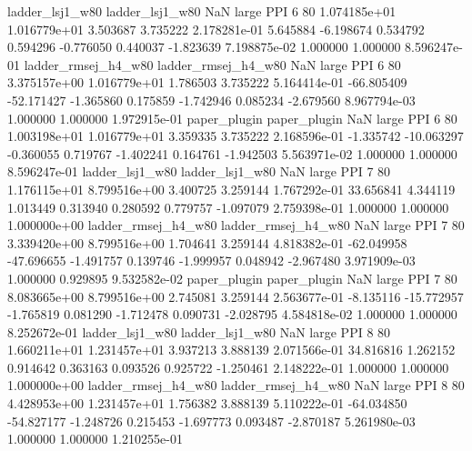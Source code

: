     ladder_lsj1_w80     ladder_lsj1_w80                   NaN      large      PPI                 6 80 1.074185e+01   1.016779e+01      3.503687       3.735222  2.178281e-01      5.645884     -6.198674     0.534792       0.594296 -0.776050   0.440037    -1.823639   7.198875e-02            1.000000        1.000000        8.596247e-01
ladder_rmsej_h4_w80 ladder_rmsej_h4_w80                   NaN      large      PPI                 6 80 3.375157e+00   1.016779e+01      1.786503       3.735222  5.164414e-01    -66.805409    -52.171427    -1.365860       0.175859 -1.742946   0.085234    -2.679560   8.967794e-03            1.000000        1.000000        1.972915e-01
       paper_plugin        paper_plugin                   NaN      large      PPI                 6 80 1.003198e+01   1.016779e+01      3.359335       3.735222  2.168596e-01     -1.335742    -10.063297    -0.360055       0.719767 -1.402241   0.164761    -1.942503   5.563971e-02            1.000000        1.000000        8.596247e-01
    ladder_lsj1_w80     ladder_lsj1_w80                   NaN      large      PPI                 7 80 1.176115e+01   8.799516e+00      3.400725       3.259144  1.767292e-01     33.656841      4.344119     1.013449       0.313940  0.280592   0.779757    -1.097079   2.759398e-01            1.000000        1.000000        1.000000e+00
ladder_rmsej_h4_w80 ladder_rmsej_h4_w80                   NaN      large      PPI                 7 80 3.339420e+00   8.799516e+00      1.704641       3.259144  4.818382e-01    -62.049958    -47.696655    -1.491757       0.139746 -1.999957   0.048942    -2.967480   3.971909e-03            1.000000        0.929895        9.532582e-02
       paper_plugin        paper_plugin                   NaN      large      PPI                 7 80 8.083665e+00   8.799516e+00      2.745081       3.259144  2.563677e-01     -8.135116    -15.772957    -1.765819       0.081290 -1.712478   0.090731    -2.028795   4.584818e-02            1.000000        1.000000        8.252672e-01
    ladder_lsj1_w80     ladder_lsj1_w80                   NaN      large      PPI                 8 80 1.660211e+01   1.231457e+01      3.937213       3.888139  2.071566e-01     34.816816      1.262152     0.914642       0.363163  0.093526   0.925722    -1.250461   2.148222e-01            1.000000        1.000000        1.000000e+00
ladder_rmsej_h4_w80 ladder_rmsej_h4_w80                   NaN      large      PPI                 8 80 4.428953e+00   1.231457e+01      1.756382       3.888139  5.110222e-01    -64.034850    -54.827177    -1.248726       0.215453 -1.697773   0.093487    -2.870187   5.261980e-03            1.000000        1.000000        1.210255e-01
